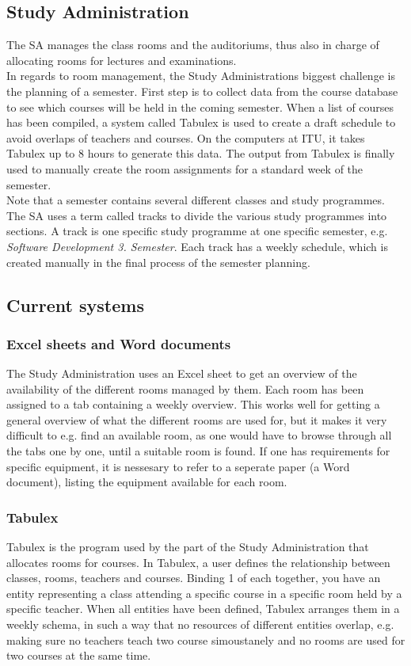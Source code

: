 \subsection{Study Administration}
The SA manages the class rooms and the auditoriums, thus also in charge of allocating rooms for lectures and examinations. \\
In regards to room management, the Study Administrations biggest challenge is the planning of a semester. First step is to collect data from the course database to see which courses will be held in the coming semester. When a list of courses has been compiled, a system called Tabulex is used to create a draft schedule to avoid overlaps of teachers and courses. On the computers at ITU, it takes Tabulex up to 8 hours to generate this data. The output from Tabulex is finally used to manually create the room assignments for a standard week of the semester.\\
Note that a semester contains several different classes and study programmes. The SA uses a term called tracks to divide the various study programmes into sections. A track is one specific study programme at one specific semester, e.g. \emph{Software Development 3. Semester}. Each track has a weekly schedule, which is created manually in the final process of the semester planning.

\subsection{Current systems}
\label{sub:current_systems}
\subsubsection*{Excel sheets and Word documents}
The Study Administration uses an Excel sheet to get an overview of the availability of the different rooms managed by them. Each room has been assigned to a tab containing a weekly overview. This works well for getting a general overview of what the different rooms are used for, but it makes it very difficult to e.g. find an available room, as one would have to browse through all the tabs one by one, until a suitable room is found. If one has requirements for specific equipment, it is nessesary to refer to a seperate paper (a Word document), listing the equipment available for each room.

\subsubsection*{Tabulex}
\label{subsub:tabulex}
Tabulex is the program used by the part of the Study Administration that allocates rooms for courses. In Tabulex, a user defines the relationship between classes, rooms, teachers and courses. Binding 1 of each together, you have an entity representing a class attending a specific course in a specific room held by a specific teacher. When all entities have been defined, Tabulex arranges them in a weekly schema, in such a way that no resources of different entities overlap, e.g. making sure no teachers teach two course simoustanely and no rooms are used for two courses at the same time.\\

